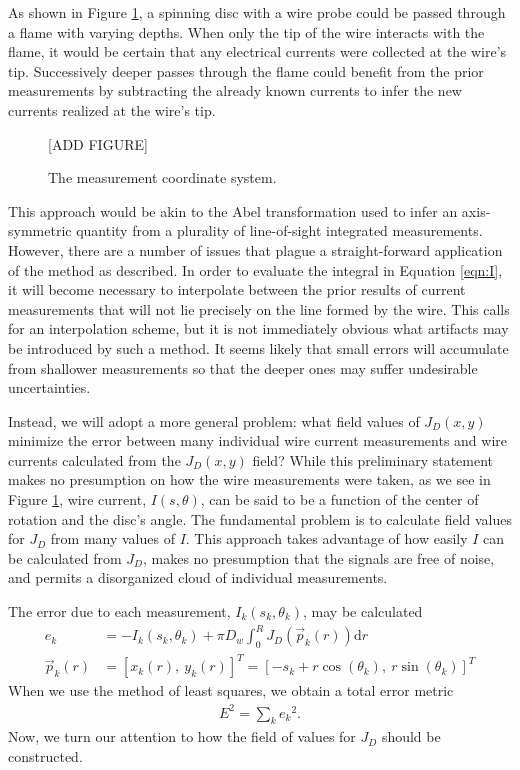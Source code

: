As shown in Figure \ref{fig:coordinate}, a spinning disc with a wire probe could be passed through a flame with varying depths.  When only the tip of the wire interacts with the flame, it would be certain that any electrical currents were collected at the wire's tip.  Successively deeper passes through the flame could benefit from the prior measurements by subtracting the already known currents to infer the new currents realized at the wire's tip. 

\begin{figure}
\begin{center}
[ADD FIGURE]
\caption{The measurement coordinate system.}\label{fig:coordinate}
\end{center}
\end{figure}

This approach would be akin to the Abel transformation used to infer an axis-symmetric quantity from a plurality of line-of-sight integrated measurements.  However, there are a number of issues that plague a straight-forward application of the method as described.  In order to evaluate the integral in Equation \ref{eqn:I}, it will become necessary to interpolate between the prior results of current measurements that will not lie precisely on the line formed by the wire.  This calls for an interpolation scheme, but it is not immediately obvious what artifacts may be introduced by such a method.  It seems likely that small errors will accumulate from shallower measurements so that the deeper ones may suffer undesirable uncertainties.

Instead, we will adopt a more general problem: what field values of $J_D(x,y)$ minimize the error between many individual wire current measurements and wire currents calculated from the $J_D(x,y)$ field?  While this preliminary statement makes no presumption on how the wire measurements were taken, as we see in Figure \ref{fig:coordinate}, wire current, $I(s,\theta)$, can be said to be a function of the center of rotation and the disc's angle.  The fundamental problem is to calculate field values for $J_D$ from many values of $I$.  This approach takes advantage of how easily $I$ can be calculated from $J_D$, makes no presumption that the signals are free of noise, and permits a disorganized cloud of individual measurements.

The error due to each measurement, $I_k(s_k, \theta_k)$, may be calculated
\begin{align}
e_k &= - I_k\left(s_k, \theta_k\right) + \pi D_w \int_0^R J_D\left(\vec{p}_k(r)\right) \mathrm{d} r\label{eqn:ek}\\
\vec{p}_k(r) &= [x_k(r),\ y_k(r)]^T = [-s_k + r\cos(\theta_k),\ r\sin(\theta_k)]^T \nonumber
\end{align}
When we use the method of least squares, we obtain a total error metric
\begin{align}
E^2 = \sum_k e_k{^2}.
\end{align}
Now, we turn our attention to how the field of values for $J_D$ should be constructed.
